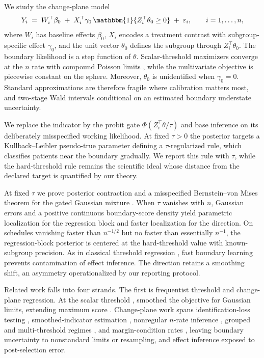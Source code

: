 \documentclass[11pt]{article}
\theoremstyle{definition}
\theoremstyle{plain}
\begin{document}
We study the change-plane model
\[
Y_i \;=\; W_i^\top\beta_0 \;+\; X_i^\top\gamma_0\,\mathbbm{1}\{Z_i^\top\theta_0\ge 0\} \;+\; \varepsilon_i,
\qquad i=1,\dots,n,
\]
where $W_i$ has baseline effects $\beta_0$, $X_i$ encodes a treatment contrast with subgroup-specific effect $\gamma_0$, and the unit vector $\theta_0$ defines the subgroup through $Z_i^\top\theta_0$. The boundary likelihood is a step function of $\theta$. Scalar-threshold maximizers converge at the $n$ rate with compound Poisson limits \citep{Chan1993}, while the multivariate objective is piecewise constant on the sphere. Moreover, $\theta_0$ is unidentified when $\gamma_0=0$. Standard approximations are therefore fragile where calibration matters most, and two-stage Wald intervals conditional on an estimated boundary understate uncertainty.

We replace the indicator by the probit gate $\Phi(Z_i^\top\theta/\tau)$ and base inference on its deliberately misspecified working likelihood. At fixed $\tau>0$ the posterior targets a Kullback--Leibler pseudo-true parameter defining a $\tau$-regularized rule, which classifies patients near the boundary gradually. We report this rule with $\tau$, while the hard-threshold rule remains the scientific ideal whose distance from the declared target is quantified by our theory.

At fixed $\tau$ we prove posterior contraction and a misspecified Bernstein--von Mises theorem for the gated Gaussian mixture \citep{Kleijn2012}. When $\tau$ vanishes with $n$, Gaussian errors and a positive continuous boundary-score density yield parametric localization for the regression block and faster localization for the direction. On schedules vanishing faster than $n^{-1/2}$ but no faster than essentially $n^{-1}$, the regression-block posterior is centered at the hard-threshold value with known-subgroup precision. As in classical threshold regression \citep{Chan1993,Hansen2000}, fast boundary learning prevents contamination of effect inference. The direction retains a smoothing shift, an asymmetry operationalized by our reporting protocol.

Related work falls into four strands. The first is frequentist threshold and change-plane regression. At the scalar threshold \citep{Chan1993, Hansen2000}, \citet{SeoLinton2007} smoothed the objective for Gaussian limits, extending maximum score \citep{Manski1985, Horowitz1992}. Change-plane work spans identification-loss testing \citep{BanerjeeMcKeague2007, LeeSeoShin2011, Fan2017, Kang2017}, smoothed-indicator estimation \citep{Li2021, Zhang2022}, nonregular $n$-rate inference \citep{Kang2025}, grouped and multi-threshold regimes \citep{Wei2018, YuFan2021}, and margin-condition rates \citep{Mukherjee2023}, leaving boundary uncertainty to nonstandard limits or resampling, and effect inference exposed to post-selection error.
\end{document}
